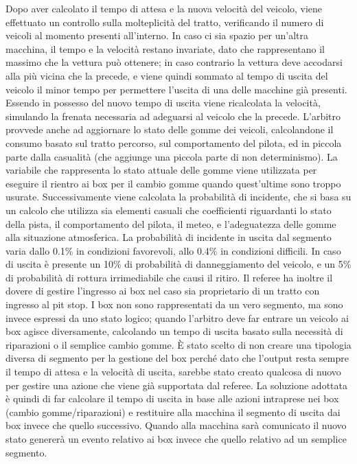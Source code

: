 Dopo aver calcolato il tempo di attesa e la nuova velocità del veicolo, viene effettuato un controllo sulla molteplicità del tratto, verificando il numero di veicoli al momento presenti all’interno. In caso ci sia spazio per un’altra macchina, il tempo e la velocità restano invariate, dato che rappresentano il massimo che la vettura può ottenere; in caso contrario la vettura deve accodarsi alla più vicina che la precede, e viene quindi sommato al tempo di uscita del veicolo il minor tempo per permettere l’uscita di una delle macchine già presenti.
Essendo in possesso del nuovo tempo di uscita viene ricalcolata la velocità, simulando la frenata necessaria ad adeguarsi al veicolo che la precede.
L’arbitro provvede anche ad aggiornare lo stato delle gomme dei veicoli, calcolandone il consumo basato sul tratto percorso, sul comportamento del pilota, ed in piccola parte dalla casualità (che aggiunge una piccola parte di non determinismo). La variabile che rappresenta lo stato attuale delle gomme viene utilizzata per eseguire il rientro ai box per il cambio gomme quando quest’ultime sono troppo usurate.
Successivamente viene calcolata la probabilità di incidente, che si basa su un calcolo che utilizza sia elementi casuali che coefficienti riguardanti lo stato della pista, il comportamento del pilota, il meteo, e l’adeguatezza delle gomme alla situazione atmosferica. La probabilità di incidente in uscita dal segmento varia dallo 0.1\% in condizioni favorevoli, allo 0.4\% in condizioni difficili.
In caso di uscita è presente un 10\% di probabilità di danneggiamento del veicolo, e un 5\% di probabilità di rottura irrimediabile che causi il ritiro.
Il referee ha inoltre il dovere di gestire l’ingresso ai box nel caso sia proprietario di un tratto con ingresso al pit stop. I box non sono rappresentati da un vero segmento, ma sono invece espressi da uno stato logico; quando l’arbitro deve far entrare un veicolo ai box agisce diversamente, calcolando un tempo di uscita basato sulla necessità di riparazioni o il semplice cambio gomme. È stato scelto di non creare una tipologia diversa di segmento per la gestione del box perché dato che l’output resta sempre il tempo di attesa e la velocità di uscita, sarebbe stato creato qualcosa di nuovo per gestire una azione che viene già supportata dal referee. La soluzione adottata è quindi di far calcolare il tempo di uscita in base alle azioni intraprese nei box (cambio gomme/riparazioni) e restituire alla macchina il segmento di uscita dai box invece che quello successivo. Quando alla macchina sarà comunicato il nuovo stato genererà un evento relativo ai box invece che quello relativo ad un semplice segmento.

